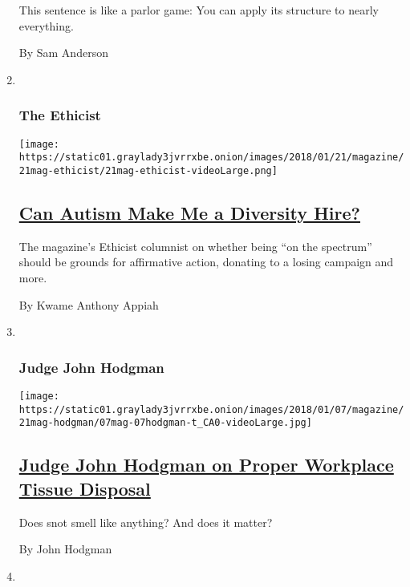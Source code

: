 \begin{enumerate}
  This sentence is like a parlor game: You can apply its structure to
  nearly everything.

  By Sam Anderson
\item ~
  \hypertarget{the-ethicist}{%
  \subsubsection{The Ethicist}\label{the-ethicist}}

  \texttt{[image: https://static01.graylady3jvrrxbe.onion/images/2018/01/21/magazine/21mag-ethicist/21mag-ethicist-videoLarge.png]}

  \hypertarget{can-autism-make-me-a-diversity-hire}{%
  \subsection{\texorpdfstring{\href{/2018/01/17/magazine/can-autism-make-me-a-diversity-hire.html}{Can
  Autism Make Me a Diversity
  Hire?}}{Can Autism Make Me a Diversity Hire?}}\label{can-autism-make-me-a-diversity-hire}}

  The magazine's Ethicist columnist on whether being ``on the spectrum''
  should be grounds for affirmative action, donating to a losing
  campaign and more.

  By Kwame Anthony Appiah
\item ~
  \hypertarget{judge-john-hodgman}{%
  \subsubsection{Judge John Hodgman}\label{judge-john-hodgman}}

  \texttt{[image: https://static01.graylady3jvrrxbe.onion/images/2018/01/07/magazine/21mag-hodgman/07mag-07hodgman-t\_CA0-videoLarge.jpg]}

  \hypertarget{judge-john-hodgman-on-proper-workplace-tissue-disposal}{%
  \subsection{\texorpdfstring{\href{/2018/01/19/magazine/judge-john-hodgman-on-proper-workplace-tissue-disposal.html}{Judge
  John Hodgman on Proper Workplace Tissue
  Disposal}}{Judge John Hodgman on Proper Workplace Tissue Disposal}}\label{judge-john-hodgman-on-proper-workplace-tissue-disposal}}

  Does snot smell like anything? And does it matter?

  By John Hodgman
\item ~
  \hypertarget{tip}{%
}
\end{enumerate}
